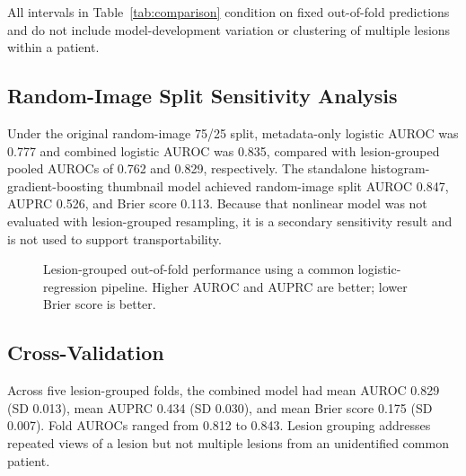 \documentclass[11pt]{article}
\begin{document}
All intervals in Table~\ref{tab:comparison} condition on fixed out-of-fold predictions and do not include model-development variation or clustering of multiple lesions within a patient.

\subsection{Random-Image Split Sensitivity Analysis}
Under the original random-image 75/25 split, metadata-only logistic AUROC was 0.777 and combined logistic AUROC was 0.835, compared with lesion-grouped pooled AUROCs of 0.762 and 0.829, respectively. The standalone histogram-gradient-boosting thumbnail model achieved random-image split AUROC 0.847, AUPRC 0.526, and Brier score 0.113. Because that nonlinear model was not evaluated with lesion-grouped resampling, it is a secondary sensitivity result and is not used to support transportability.

\begin{figure}[H]
\centering
{}
\caption{Lesion-grouped out-of-fold performance using a common logistic-regression pipeline. Higher AUROC and AUPRC are better; lower Brier score is better.}
\label{fig:modelcomparison}
\end{figure}

\subsection{Cross-Validation}
Across five lesion-grouped folds, the combined model had mean AUROC 0.829 (SD 0.013), mean AUPRC 0.434 (SD 0.030), and mean Brier score 0.175 (SD 0.007). Fold AUROCs ranged from 0.812 to 0.843. Lesion grouping addresses repeated views of a lesion but not multiple lesions from an unidentified common patient.
\end{document}

